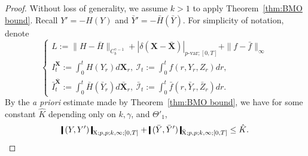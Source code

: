 \documentclass[11pt,reqno]{amsart}
\numberwithin{equation}{section}
\newcommand{\shortthickbar}{%
  \vcenter{\hbox{\rule{1.8pt}{2.2ex}}}%
}
\newcommand{\thicknm}[1]{%
  \mathopen{\shortthickbar}%
  \mkern4mu #1 \mkern4mu%
  \mathclose{\shortthickbar}%
}
\begin{document}
\begin{proof}
Without loss of generality, we assume $k > 1$ to apply  Theorem~\ref{thm:BMO bound}.
Recall $Y' = -H(Y)$ and $\bar Y' = - \bar H(\bar Y)$. For simplicity of notation, denote 
\begin{equation*}
\begin{cases}\displaystyle
L := \|H - \bar H\|_{C^{\gamma - 1}_b} + |\delta (\mathbf X - \bar{\mathbf X})|_{p\text{-}\mathrm{var};[0,T]} + \|f - \bar f\|_{\infty} \\ \displaystyle
I^{\mathbf X}_t := \int_0^t H(Y_r) d\mathbf X_r,\ \mathcal I_t := \int_{0}^t f(r, Y_r,  Z_r) dr, \\ \displaystyle
\bar I^{\bar{\mathbf X}}_t := \int_0^t \bar H(\bar Y_r) d\bar{\mathbf X}_r,\  \bar{\mathcal I}_t := \int_{0}^t \bar f(r,\bar Y_r,\bar Z_r) dr. 
\end{cases}
\end{equation*}
By the \emph{a priori} estimate made by Theorem~\ref{thm:BMO bound}, we have for some constant $\hat K$ depending only on $k,\gamma$, and $\Theta'_1$, 
\begin{equation*}
\thicknm{(Y,Y')}_{\mathrm X;p,p;k,\infty;[0,T]} +  \thicknm{(\bar Y,\bar Y')}_{\bar{\mathrm X};p,p;k,\infty;[0,T]} \le \hat K.
\end{equation*}


\end{proof}
\end{document}
